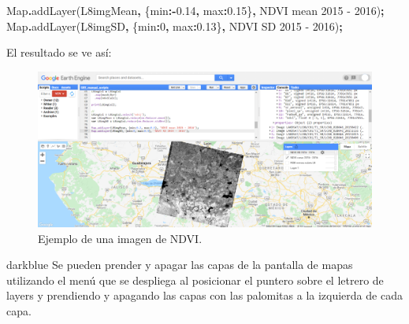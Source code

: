 \documentclass[
  12pt,
  letterpaper,
  twoside]{book}
\newenvironment{Shaded}{\begin{snugshade}}{\end{snugshade}}
\newcommand{\BuiltInTok}[1]{#1}
\newcommand{\DataTypeTok}[1]{\textcolor[rgb]{0.13,0.29,0.53}{#1}}
\newcommand{\DecValTok}[1]{\textcolor[rgb]{0.00,0.00,0.81}{#1}}
\newcommand{\FloatTok}[1]{\textcolor[rgb]{0.00,0.00,0.81}{#1}}
\newcommand{\FunctionTok}[1]{\textcolor[rgb]{0.00,0.00,0.00}{#1}}
\newcommand{\NormalTok}[1]{#1}
\newcommand{\OperatorTok}[1]{\textcolor[rgb]{0.81,0.36,0.00}{\textbf{#1}}}
\newcommand{\StringTok}[1]{\textcolor[rgb]{0.31,0.60,0.02}{#1}}
\begin{document}
\begin{Shaded}
\begin{Highlighting}[]
\BuiltInTok{Map}\OperatorTok{.}\FunctionTok{addLayer}\NormalTok{(L8imgMean}\OperatorTok{,}\NormalTok{ \{}\DataTypeTok{min}\OperatorTok{:{-}}\FloatTok{0.14}\OperatorTok{,} \DataTypeTok{max}\OperatorTok{:}\FloatTok{0.15}\NormalTok{\}}\OperatorTok{,} \StringTok{\textquotesingle{}NDVI mean 2015 {-} 2016\textquotesingle{}}\NormalTok{)}\OperatorTok{;}
\BuiltInTok{Map}\OperatorTok{.}\FunctionTok{addLayer}\NormalTok{(L8imgSD}\OperatorTok{,}\NormalTok{ \{}\DataTypeTok{min}\OperatorTok{:}\DecValTok{0}\OperatorTok{,} \DataTypeTok{max}\OperatorTok{:}\FloatTok{0.13}\NormalTok{\}}\OperatorTok{,} \StringTok{\textquotesingle{}NDVI SD 2015 {-} 2016\textquotesingle{}}\NormalTok{)}\OperatorTok{;}
\end{Highlighting}
\end{Shaded}

El resultado se ve así:

\begin{figure}

{\centering \includegraphics[width=1\linewidth]{Img/imNDVI} 

}

\caption{Ejemplo de una imagen de NDVI.}\label{fig:unnamed-chunk-158}
\end{figure}

\begin{bluebox2}

\begin{awesomeblock}{5pt}{\faLightbulb}{darkblue}
Se pueden prender y apagar las capas de la pantalla de mapas utilizando el menú que se despliega al posicionar el puntero sobre el letrero de layers y prendiendo y apagando las capas con las palomitas a la izquierda de cada capa.

\end{awesomeblock}

\end{bluebox2}
\end{document}
